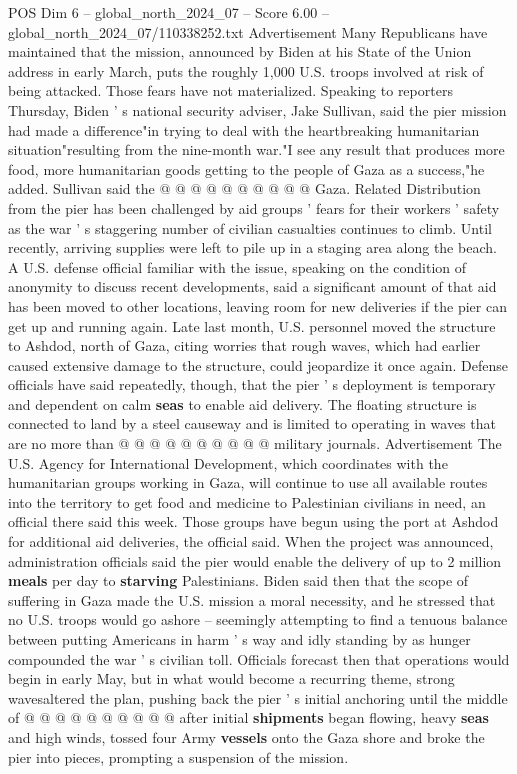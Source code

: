 \begin{textsample}{POS Dim 6 – global\_north\_2024\_07 – Score 6.00 – global\_north\_2024\_07/110338252.txt}
Advertisement Many Republicans have maintained that the mission, announced by Biden at his State of the Union address in early March, puts the roughly 1,000 U.S. troops involved at risk of being attacked.
Those fears have not materialized.
Speaking to reporters Thursday, Biden ' s national security adviser, Jake Sullivan, said the pier mission had made a difference"in trying to deal with the heartbreaking humanitarian situation"resulting from the nine-month war."I see any result that produces more food, more humanitarian goods getting to the people of Gaza as a success,"he added.
Sullivan said the @ @ @ @ @ @ @ @ @ @ Gaza.
Related Distribution from the pier has been challenged by aid groups ' fears for their workers ' safety as the war ' s staggering number of civilian casualties continues to climb.
Until recently, arriving supplies were left to pile up in a staging area along the beach.
A U.S. defense official familiar with the issue, speaking on the condition of anonymity to discuss recent developments, said a significant amount of that aid has been moved to other locations, leaving room for new deliveries if the pier can get up and running again.
Late last month, U.S. personnel moved the structure to Ashdod, north of Gaza, citing worries that rough waves, which had earlier caused extensive damage to the structure, could jeopardize it once again.
Defense officials have said repeatedly, though, that the pier ' s deployment is temporary and dependent on calm \textbf{seas} to enable aid delivery.
The floating structure is connected to land by a steel causeway and is limited to operating in waves that are no more than @ @ @ @ @ @ @ @ @ @ military journals.
Advertisement The U.S.
Agency for International Development, which coordinates with the humanitarian groups working in Gaza, will continue to use all available routes into the territory to get food and medicine to Palestinian civilians in need, an official there said this week.
Those groups have begun using the port at Ashdod for additional aid deliveries, the official said.
When the project was announced, administration officials said the pier would enable the delivery of up to 2 million \textbf{meals} per day to \textbf{starving} Palestinians.
Biden said then that the scope of suffering in Gaza made the U.S. mission a moral necessity, and he stressed that no U.S. troops would go ashore -- seemingly attempting to find a tenuous balance between putting Americans in harm ' s way and idly standing by as hunger compounded the war ' s civilian toll.
Officials forecast then that operations would begin in early May, but in what would become a recurring theme, strong wavesaltered the plan, pushing back the pier ' s initial anchoring until the middle of @ @ @ @ @ @ @ @ @ @ after initial \textbf{shipments} began flowing, heavy \textbf{seas} and high winds, tossed four Army \textbf{vessels} onto the Gaza shore and broke the pier into pieces, prompting a suspension of the mission.

\end{textsample}
